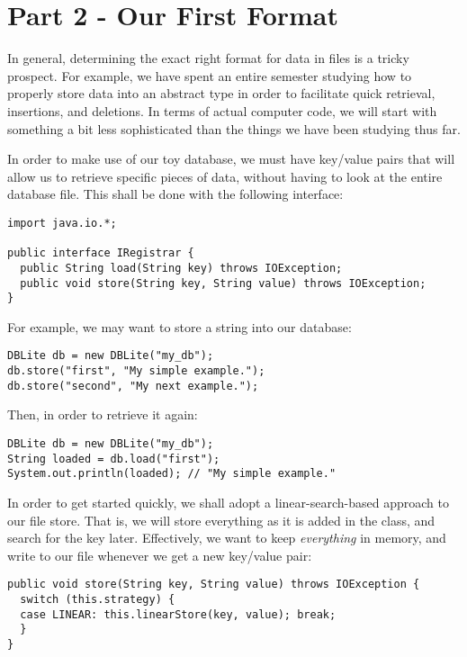 \documentclass{article}
\begin{document}
\section*{Part 2 - Our First Format}

In general, determining the exact right format for data in files is a tricky
prospect.  For example, we have spent an entire semester studying how to
properly store data into an abstract type in order to facilitate quick
retrieval, insertions, and deletions.  In terms of actual computer code, we
will start with something a bit less sophisticated than the things we have been
studying thus far.

In order to make use of our toy database, we must have key/value pairs that
will allow us to retrieve specific pieces of data, without having to look at
the entire database file.  This shall be done with the following interface:

\begin{verbatim}
import java.io.*;

public interface IRegistrar {
  public String load(String key) throws IOException;
  public void store(String key, String value) throws IOException;
}
\end{verbatim}

For example, we may want to store a string into our database:

\begin{verbatim}
DBLite db = new DBLite("my_db");
db.store("first", "My simple example.");
db.store("second", "My next example.");
\end{verbatim}

Then, in order to retrieve it again:

\begin{verbatim}
DBLite db = new DBLite("my_db");
String loaded = db.load("first");
System.out.println(loaded); // "My simple example."
\end{verbatim}

In order to get started quickly, we shall adopt a linear-search-based approach
to our file store.  That is, we will store everything as it is added in the
class, and search for the key later.  Effectively, we want to keep {\em
everything} in memory, and write to our file whenever we get a new key/value
pair:

\begin{verbatim}
public void store(String key, String value) throws IOException {
  switch (this.strategy) {
  case LINEAR: this.linearStore(key, value); break;
  }
}
\end{verbatim}
\end{document}
